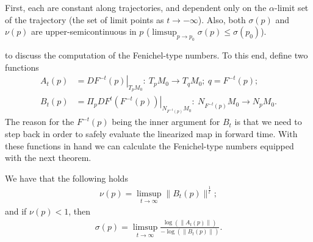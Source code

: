\begin{remark}
 First, each are constant along trajectories, and dependent only on the $\alpha $-limit set of the trajectory (the set of limit points as $t \to -\infty $). Also, both $\sigma(p)$ and $\nu(p) $ are upper-semicontinuous in $p$ ($\limsup_{p \to p_0} \sigma(p) \leq \sigma(p_0)$).
\end{remark}

to discuss the computation of the Fenichel-type numbers. To this end, define two functions
\begin{align}
	A_{t}(p) &= \left. DF^{-t}(p) \right|_{T_{p}M_0}:\ T_{p}M_0 \to T_{q}M_0;\ q = F^{-t}(p); \\
	B_{t}(p) &= \left. \Pi_{p}DF^{t}(F^{-t}(p)) \right|_{N_{F^{-t}(p)}M_0}:\ N_{F^{-t}(p)}M_0 \to N_{p}M_0.
\end{align}
The reason for the $F^{-t}(p)$ being the inner argument for $B_{t}$ is that we need to step back in order to safely evaluate the linearized map in forward time. With these functions in hand we can calculate the Fenichel-type numbers equipped with the next theorem.

\begin{theorem}[Fenichel (1971)]
We have that the following holds
\begin{align}
	\boxed{\nu(p) = \limsup_{t\to \infty }\| B_{t}(p)\|^{\frac{1}{t}}; }
\end{align}
and if $\nu(p)<1$, then
\begin{align}
	\boxed{\sigma(p) = \limsup_{t\to \infty }\frac{\log\left( \| A_{t}(p) \| \right)}{-\log \left( \| B_{t}(p) \| \right)}.}
\end{align}
\end{theorem}

